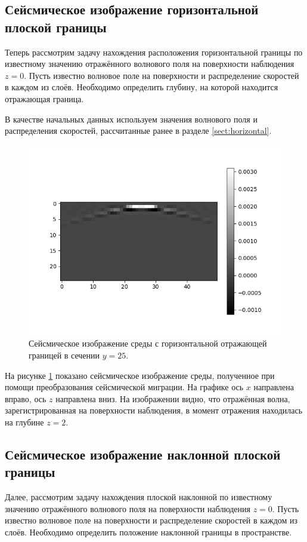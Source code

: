 \documentclass[a4paper, fontsize=14pt]{article}
\begin{document}
	\subsection{Сейсмическое изображение горизонтальной плоской границы}
	Теперь рассмотрим задачу нахождения расположения горизонтальной границы по известному значению отражённого волнового поля на поверхности наблюдения $z=0$. Пусть известно волновое поле на поверхности и распределение скоростей в каждом из слоёв. Необходимо определить глубину, на которой находится отражающая граница. 
	
	 В качестве начальных данных используем значения волнового поля и распределения скоростей, рассчитанные ранее в разделе \ref{sect:horizontal}. 
	
	\begin{figure}[H]
		\centering
		\includegraphics[width=.7\textwidth]{mig_horizontal_single.png}
		\caption{Сейсмическое изображение среды с горизонтальной отражающей границей в сечении $y=25$.}
		\label{fig:mig_hor}
	\end{figure}
	
	На рисунке \ref{fig:mig_hor} показано сейсмическое изображение среды, полученное при помощи преобразования сейсмической миграции. 
	На графике ось $x$ направлена вправо, ось $z$ направлена вниз.
	На изображении видно, что отражённая волна, зарегистрированная на поверхности наблюдения, в момент отражения находилась на глубине $z = 2$.
	
	
	\subsection{Сейсмическое изображение наклонной плоской границы}
	
	Далее, рассмотрим задачу нахождения плоской наклонной по известному значению отражённого волнового поля на поверхности наблюдения $z=0$.
	Пусть известно волновое поле на поверхности и распределение скоростей в каждом из слоёв. Необходимо определить положение наклонной границы в пространстве.
	
\end{document}
